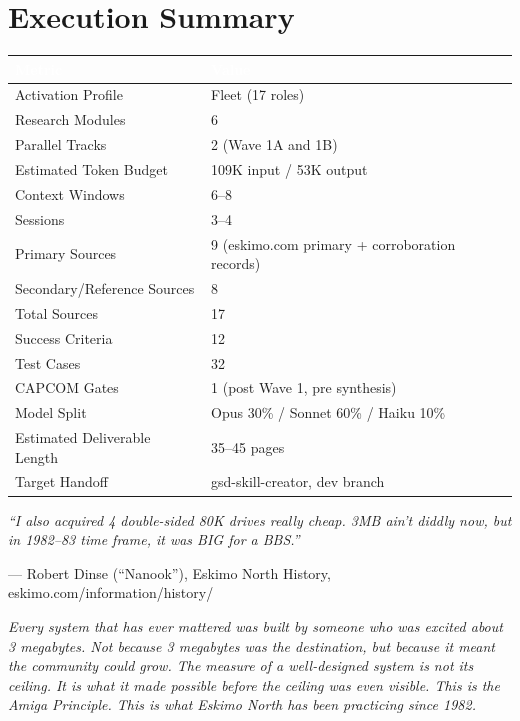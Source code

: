 \documentclass[11pt,letterpaper]{article}
\newcommand{\tableheader}[1]{\textbf{\sffamily\textcolor{white}{#1}}}
\begin{document}
\section{Execution Summary}

\begin{center}
\begin{tabularx}{\textwidth}{L{5cm}X}
\toprule
{}
\tableheader{Metric} & \tableheader{Value} \\
\midrule
Activation Profile & Fleet (17 roles) \\
Research Modules & 6 \\
Parallel Tracks & 2 (Wave 1A and 1B) \\
Estimated Token Budget & 109K input / 53K output \\
Context Windows & 6--8 \\
Sessions & 3--4 \\
Primary Sources & 9 (eskimo.com primary + corroboration records) \\
Secondary/Reference Sources & 8 \\
Total Sources & 17 \\
Success Criteria & 12 \\
Test Cases & 32 \\
CAPCOM Gates & 1 (post Wave 1, pre synthesis) \\
Model Split & Opus 30\% / Sonnet 60\% / Haiku 10\% \\
Estimated Deliverable Length & 35--45 pages \\
Target Handoff & gsd-skill-creator, dev branch & \\
\bottomrule
\end{tabularx}
\end{center}

\vspace{2em}

\begin{quotebox}
\textit{``I also acquired 4 double-sided 80K drives really cheap. 3MB ain't diddly now, but in 1982--83 time frame, it was BIG for a BBS.''}

\medskip
--- Robert Dinse (``Nanook''), Eskimo North History, eskimo.com/information/history/

\medskip
\textit{Every system that has ever mattered was built by someone who was excited about 3 megabytes. Not because 3 megabytes was the destination, but because it meant the community could grow. The measure of a well-designed system is not its ceiling. It is what it made possible before the ceiling was even visible. This is the Amiga Principle. This is what Eskimo North has been practicing since 1982.}
\end{quotebox}
\end{document}

